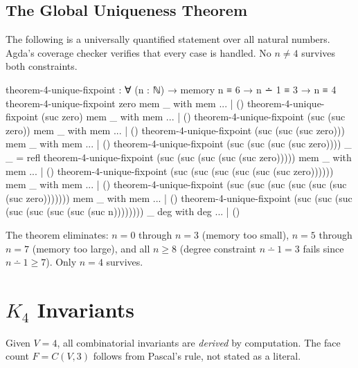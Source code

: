 \documentclass[11pt,a4paper]{article}
\begin{document}
\subsection{The Global Uniqueness Theorem}

The following is a universally quantified statement over all natural
numbers. Agda's coverage checker verifies that every case is handled.
No $n \neq 4$ survives both constraints.

\begin{code}
theorem-4-unique-fixpoint : ∀ (n : ℕ) →
  memory n ≡ 6 → n ∸ 1 ≡ 3 → n ≡ 4
theorem-4-unique-fixpoint zero mem _ with mem
... | ()
theorem-4-unique-fixpoint (suc zero) mem _ with mem
... | ()
theorem-4-unique-fixpoint (suc (suc zero)) mem _ with mem
... | ()
theorem-4-unique-fixpoint (suc (suc (suc zero))) mem _ with mem
... | ()
theorem-4-unique-fixpoint (suc (suc (suc (suc zero)))) _ _ = refl
theorem-4-unique-fixpoint (suc (suc (suc (suc (suc zero))))) mem _ with mem
... | ()
theorem-4-unique-fixpoint (suc (suc (suc (suc (suc (suc zero)))))) mem _ with mem
... | ()
theorem-4-unique-fixpoint (suc (suc (suc (suc (suc (suc (suc zero))))))) mem _
  with mem
... | ()
theorem-4-unique-fixpoint
  (suc (suc (suc (suc (suc (suc (suc (suc n)))))))) _ deg
  with deg
... | ()
\end{code}

The theorem eliminates: $n = 0$ through $n = 3$ (memory too small),
$n = 5$ through $n = 7$ (memory too large), and all $n \geq 8$
(degree constraint $n \dotminus 1 = 3$ fails since $n \dotminus 1 \geq 7$).
Only $n = 4$ survives.

\section{$K_4$ Invariants}
\label{sec:k4-invariants}

Given $V = 4$, all combinatorial invariants are \emph{derived} by computation.
The face count $F = C(V,3)$ follows from Pascal's rule, not stated as a literal.
\end{document}
